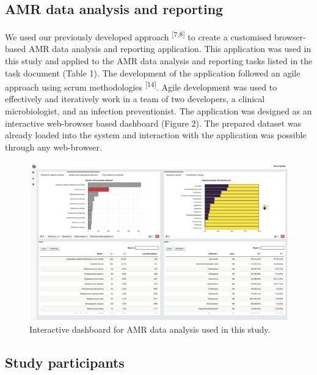 \documentclass[
]{book}
\begin{document}
\hypertarget{amr-data-analysis-and-reporting}{%
\subsection{AMR data analysis and reporting}\label{amr-data-analysis-and-reporting}}

We used our previously developed approach \textsuperscript{{[}7,8{]}} to create a customised browser-based AMR data analysis and reporting application. This application was used in this study and applied to the AMR data analysis and reporting tasks listed in the task document (Table 1). The development of the application followed an agile approach using scrum methodologies \textsuperscript{{[}14{]}}. Agile development was used to effectively and iteratively work in a team of two developers, a clinical microbiologist, and an infection preventionist. The application was designed as an interactive web-browser based dashboard (Figure 2). The prepared dataset was already loaded into the system and interaction with the application was possible through any web-browser.

\begin{figure}

{\centering \includegraphics[width=1\linewidth]{images/06-02} 

}

\caption{Interactive dashboard for AMR data analysis used in this study.}\label{fig:fig6-2}
\end{figure}

\hypertarget{study-participants}{%
\subsection{Study participants}\label{study-participants}}
\end{document}
